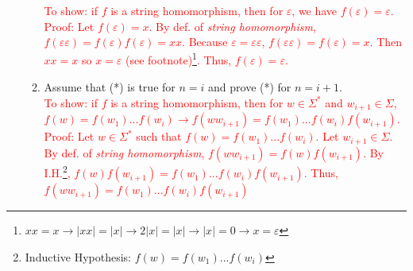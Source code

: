 \documentclass{article}
\newcommand{\e}{\varepsilon}
\newcommand{\s}{\Sigma}
\newcommand{\so}{\rightarrow}
\newcommand{\newp}{\\[2mm]}
\begin{document}
\begin{enumerate}
\begin{enumerate}
        \textcolor{red}{
            To show: if $f$ is a string homomorphism, then for $\e$, we have $f(\e) = \e$.\newp
            Proof: Let $f(\e) = x$. By def. of \textit{string homomorphism}, $f(\e\e)=f(\e)f(\e)=xx$. Because $\e=\e\e$, $f(\e\e)=f(\e)=x$. Then $xx=x$ so $x=\e$ (see footnote)\footnote{$xx=x \so |xx|=|x| \so 2|x|=|x| \so |x|=0 \so x=\e$}. Thus, $f(\e) = \e$.
        }
        \item Assume that (*) is true for $n = i$ and prove (*) for $n = i + 1$.\newp
        \textcolor{red}{
        To show: if $f$ is a string homomorphism, then for $w \in \s^*$ and $w_{i+1} \in \s$, $f(w) = f(w_1)...f(w_i) \rightarrow f(ww_{i+1}) = f(w_1)...f(w_{i})f(w_{i+1})$.\newp
        Proof: Let $w \in \s^*$ such that $f(w) = f(w_1)...f(w_i)$. Let $w_{i+1} \in \s$. By def. of \textit{string homomorphism}, $f(ww_{i+1})=f(w)f(w_{i+1})$. By I.H.\footnote{ Inductive Hypothesis: $f(w) = f(w_1)...f(w_i)$}, $f(w)f(w_{i+1})=f(w_1)...f(w_{i})f(w_{i+1})$. Thus, $f(ww_{i+1}) = f(w_1)...f(w_{i})f(w_{i+1})$
        }
    \end{enumerate}


\end{enumerate}
\end{document}
